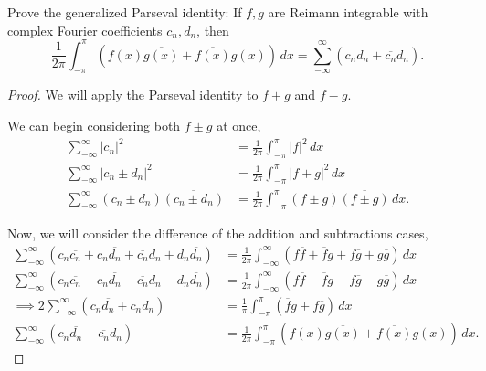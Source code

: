 \documentclass[../hw6]{subfiles}
\begin{document}
\begin{problem}
Prove the generalized Parseval identity:
If $f,g$ are Reimann integrable with complex Fourier coefficients $c_n,d_n$, then  \[
	\frac{1}{2\pi}\int_{-\pi}^{\pi} (f(x)\overline{g(x)}+\overline{f(x)}g(x)) \,dx
	= \sum_{-\infty}^{\infty} (c_n \overline{d_n} + \overline{c_n} d_n)
	.\]
\end{problem}
\begin{proof}
	We will apply the Parseval identity to $f+g$ and  $f-g$.

	We can begin considering both  $f \pm g$ at once,
	\begin{align*}
		\sum_{-\infty}^{\infty} |c_n|^2                               & = \frac{1}{2\pi}\int_{-\pi}^{\pi} |f|^2 \,dx                         \\
		\sum_{-\infty}^{\infty} |c_n \pm d_n|^2                       & = \frac{1}{2\pi}\int_{-\pi}^{\pi} |f + g|^2 \,dx                     \\
		\sum_{-\infty}^{\infty} (c_n \pm d_n)\overline{(c_n \pm d_n)} & = \frac{1}{2\pi}\int_{-\pi}^{\pi} (f \pm g)\overline{(f \pm g)} \,dx
		.\end{align*}

	Now, we will consider the difference of the addition and subtractions cases,
	\begin{align*}
		\sum_{-\infty}^{\infty} (c_n \overline{c_n} + c_n \overline{d_n} + \overline{c_n}d_n + d_n \overline{d_n}) & = \frac{1}{2\pi}\int_{-\infty}^{\infty} (f\overline{f}+\overline{f}g+f\overline{g}+g\overline{g}) \,dx \\
		\sum_{-\infty}^{\infty} (c_n \overline{c_n} - c_n \overline{d_n} - \overline{c_n}d_n - d_n \overline{d_n}) & = \frac{1}{2\pi}\int_{-\infty}^{\infty} (f\overline{f}-\overline{f}g-f\overline{g}-g\overline{g}) \,dx \\
		\implies 2 \sum_{-\infty}^{\infty} (c_n \overline{d_n} +  \overline{c_n}d_n)                               & = \frac{1}{\pi} \int_{-\pi}^{\pi} (\overline{f}g+f\overline{g}) \,dx                                   \\
		\sum_{-\infty}^{\infty} (c_n \overline{d_n} + \overline{c_n}d_n)                                           & = \frac{1}{2\pi}\int_{-\pi}^{\pi}  (f(x)\overline{g(x)}+\overline{f(x)}g(x)) \,dx
		.\end{align*}
\end{proof}
\end{document}
